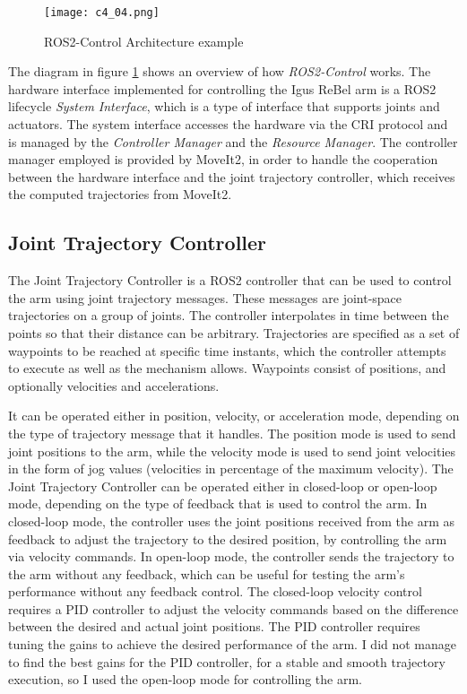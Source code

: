 \begin{figure}[t]
    \centering
    \texttt{[image: c4\_04.png]}
    \caption{ROS2-Control Architecture example}
    \label{fig:ros2control}
\end{figure}

The diagram in figure \ref{fig:ros2control} shows an overview of how \textit{ROS2-Control} works.
The hardware interface implemented for controlling the Igus ReBel arm is a ROS2 lifecycle \textit{System Interface},
which is a type of interface that supports joints and actuators. The system interface accesses the hardware
via the CRI protocol and is managed by the \textit{Controller Manager} and the \textit{Resource Manager}. The
controller manager employed is provided by MoveIt2, in order to handle the cooperation between the hardware
interface and the joint trajectory controller, which receives the computed trajectories from MoveIt2.

\subsection{Joint Trajectory Controller}

The Joint Trajectory Controller is a ROS2 controller that can be used to control the arm using joint trajectory messages.
These messages are joint-space trajectories on a group of joints.
The controller interpolates in time between the points so that their distance can be arbitrary. 
Trajectories are specified as a set of waypoints to be reached at specific time instants, which the controller 
attempts to execute as well as the mechanism allows. Waypoints consist of positions, and optionally velocities and accelerations.

It can be operated either in position, velocity, or acceleration mode, depending on the type of trajectory message
that it handles.
The position mode is used to send joint positions to the arm, while the velocity mode is used to send joint velocities
in the form of jog values (velocities in percentage of the maximum velocity). The Joint Trajectory Controller can
be operated either in closed-loop or open-loop mode, depending on the type of feedback that is used to control the arm.
In closed-loop mode, the controller uses the joint positions received from the arm as feedback to adjust the trajectory
to the desired position, by controlling the arm via velocity commands. In open-loop mode, the controller sends the
trajectory to the arm without any feedback, which can be useful for testing the arm's performance without any feedback
control. The closed-loop velocity control requires a PID controller to adjust the velocity commands based on the
difference between the desired and actual joint positions. The PID controller requires tuning the gains to
achieve the desired performance of the arm. I did not manage to find the best gains for the PID controller,
for a stable and smooth trajectory execution, so I used the open-loop mode for controlling the arm.

